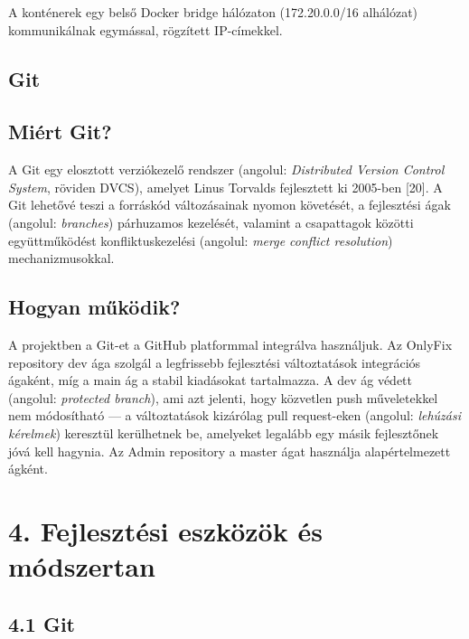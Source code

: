 A konténerek egy belső Docker bridge hálózaton (172.20.0.0/16 alhálózat) kommunikálnak egymással, rögzített IP-címekkel.

\subsection{Git}\label{git}

\subsection{Miért Git?}\label{miuxe9rt-git}

A Git egy elosztott verziókezelő rendszer (angolul: \emph{Distributed Version Control System}, röviden DVCS), amelyet Linus Torvalds fejlesztett ki 2005-ben {[}20{]}. A Git lehetővé teszi a forráskód változásainak nyomon követését, a fejlesztési ágak (angolul: \emph{branches}) párhuzamos kezelését, valamint a csapattagok közötti együttműködést konfliktuskezelési (angolul: \emph{merge conflict resolution}) mechanizmusokkal.

\subsection{Hogyan működik?}\label{hogyan-mux171kuxf6dik-6}

A projektben a Git-et a GitHub platformmal integrálva használjuk. Az OnlyFix repository dev ága szolgál a legfrissebb fejlesztési változtatások integrációs ágaként, míg a main ág a stabil kiadásokat tartalmazza. A dev ág védett (angolul: \emph{protected branch}), ami azt jelenti, hogy közvetlen push műveletekkel nem módosítható --- a változtatások kizárólag pull request-eken (angolul: \emph{lehúzási kérelmek}) keresztül kerülhetnek be, amelyeket legalább egy másik fejlesztőnek jóvá kell hagynia. Az Admin repository a master ágat használja alapértelmezett ágként.

\protect{}\label{_Toc223012185}{}

\section{4. Fejlesztési eszközök és módszertan}\label{fejlesztuxe9si-eszkuxf6zuxf6k-uxe9s-muxf3dszertan}

\subsection{4.1 Git}\label{git-1}

